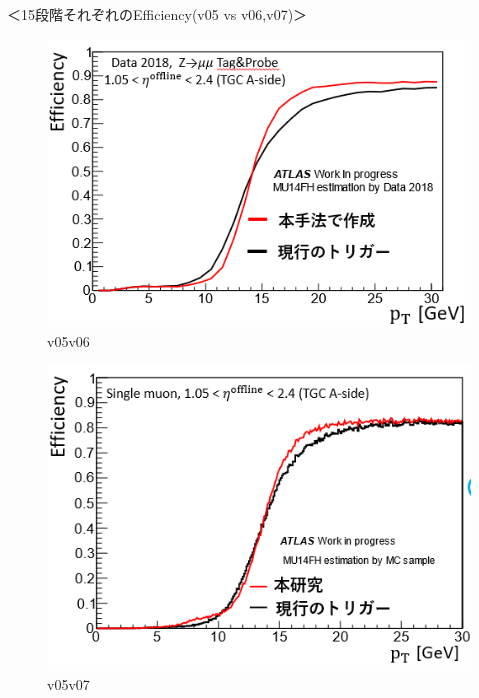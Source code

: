 ＜15段階それぞれのEfficiency(v05 vs v06,v07)＞\\
\begin{figure}[tb]
  \centering
  \includegraphics[clip, width=14cm]{fig/4/hikaku_v05_v06.png}
  \caption{v05v06}
  \label{fig:Resolution}
\end{figure}

\begin{figure}[tb]
  \centering
  \includegraphics[clip, width=14cm]{fig/4/hikaku_v05_v07.png}
  \caption{v05v07}
  \label{fig:Resolution}
\end{figure}

